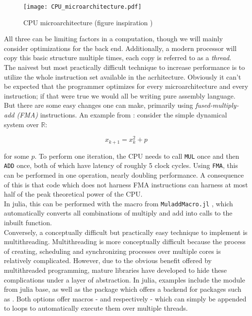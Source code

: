 \begin{figure}[ht]
    \centering
    \texttt{[image: CPU\_microarchitecture.pdf]}
    \caption{CPU microarchitecture (figure inspiration \cite*{solvercomp, uops.info})}
    \label{fig:CPU}
\end{figure}

All three can be limiting factors in a computation, though we will mainly consider 
optimizations for the back end. Additionally, a modern processor will copy this basic 
structure multiple times, each copy is referred to as a \emph{thread}. \\

The naivest but most practically difficult technique to increase performance is to utilize 
the whole instruction set available in the acrhitecture. Obviously it can't be expected 
that the programmer optimizes for every microarchitecture and every instruction; if that were 
true we would all be writing pure assembly language. But there are some easy changes one 
can make, primarily using \emph{fused-multiply-add (FMA)} instructions. An example from 
\cite*{solvercomp}: consider the simple dynamical system over $\mathbb{R}$:

\begin{equation}{}
    x_{k+1} = x_k^2 + p
\end{equation}

for some $p$. To perform one iteration, the CPU needs to call \texttt{MUL} once and then 
\texttt{ADD} once, both of which have latency of roughly 5 clock cycles. Using 
\texttt{FMA}, this can be performed in one operation, nearly doubling performance. A 
consequence of this is that code which does not harness FMA instructions can harness at 
most half of the peak theoretical power of the CPU. \\

In julia, this can be performed with the  macro from \texttt{MuladdMacro.jl} 
\cite*{muladd}, which automatically converts all combinations of multiply and add into 
calls to the inbuilt  function. \\

Conversely, a conceptually difficult but practically easy technique to implement is 
multithreading. Multithreading is more conceptually difficult because the process of 
creating, scheduling and synchronizing processes over multiple cores is relatively 
complicated. However, due to the obvious benefit offered by multithreaded programming, 
mature libraries have developed to hide these complications under a layer of abstraction. 
In julia, examples include the  module from julia base, as well as the 
package  \cite*{transducers} which offers a backend for packages 
such as  \cite*{floops}. Both options offer macros - 
 and  respectively - which can simply be appended to 
 loops to automatically execute them over multiple threads. \\

